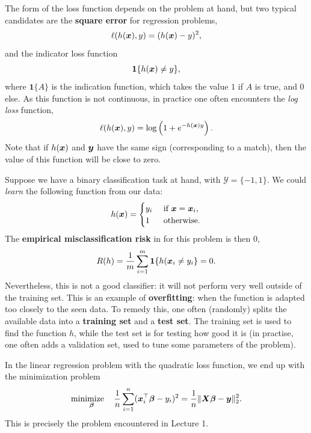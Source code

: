 The form of the loss function depends on the problem at hand, but two typical candidates are the \textbf{square error} for regression problems,
\begin{equation*}
  \ell(h(\bm{x}),y) = (h(\bm{x})-y)^2,
\end{equation*}
and the indicator loss function
\begin{equation*}
  \mathbf{1}\{h(\bm{x})\neq y\},
\end{equation*}
where $\mathbf{1}\{A\}$ is the indication function, which takes the value $1$ if $A$ is true, and $0$ else. As this function is not continuous, in practice one often encounters the {\em log loss} function,
\begin{equation*}
  \ell(h(\bm{x}),y) = \log\left(1+e^{-h(\bm{x})y} \right).
\end{equation*}
Note that if $h(\bm{x})$ and $\bm{y}$ have the same sign (corresponding to a match), then the value of this function will be close to zero. 

Suppose we have a binary classification task at hand, with $\mathcal{Y}=\{-1,1\}$. We could {\em learn} the following function from our data:
\begin{equation*}
  h(\bm{x}) = \begin{cases}
    y_i & \text{ if } \bm{x}=\bm{x}_i,\\
    1 & \text{ otherwise.}
  \end{cases}
\end{equation*}
The \textbf{empirical misclassification risk} in for this problem is then $0$,
\begin{equation*}
  R(h) = \frac{1}{m} \sum_{i=1}^m \mathbf{1}\{h(\bm{x}_i\neq y_i\} = 0.
\end{equation*}
Nevertheless, this is not a good classifier: it will not perform very well outside of the training set. This is an example of \textbf{overfitting}: when the function is adapted too closely to the seen data. To remedy this, one often (randomly) splits the available data into a \textbf{training set} and a \textbf{test set}. The training set is used to find the function $h$, while the test set is for testing how good it is (in practise, one often adds a validation set, used to tune some parameters of the problem).

\begin{example}
In the linear regression problem with the quadratic loss function, we end up with the minimization problem
\begin{equation*}
  \mathop{\text{minimize}\quad}_{\bm{\beta}} \frac{1}{n} \sum_{i=1}^n (\bm{x}_i^{\top}\bm{\beta}-y_i)^2 =\frac{1}{n}\Vert {\bm{X}\bm{\beta}-\bm{y}}\Vert_2^2.
\end{equation*}
This is precisely the problem encountered in Lecture 1.
\end{example}

